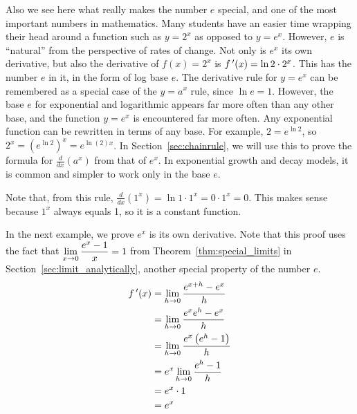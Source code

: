 Also we see here what really makes the number $e$ special, and one of the most important numbers in mathematics.  Many students have an easier time wrapping their head around a function such as $y=2^x$ as opposed to $y=e^x$.  However, $e$ is ``natural'' from the perspective of rates of change.  Not only is $e^x$ its own derivative, but also the derivative of $f(x)=2^x$ is $f\,'(x)=\ln 2\cdot 2^x$.  This has the number $e$ in it, in the form of log base $e$.
The derivative rule for $y=e^x$ can be remembered as a special case of the $y=a^x$ rule, since $\ln e=1$.  However,
the base $e$ for exponential and logarithmic appears far more often than any other base, and the function $y=e^x$ is encountered far more often.
Any exponential function can be rewritten in terms of any base.  For example, $2=e^{\ln 2}$, so $2^x=\left(e^{\ln 2}\right)^x = e^{\ln(2) x}$.
In Section~\ref{sec:chainrule}, we will use this to prove the formula for $\frac{d}{dx}(a^x)$ from that of $e^x$.
In exponential growth and decay models, it is common and simpler to work only in the base $e$.

Note that, from this rule, $\frac{d}{dx}(1^x)=\ln 1\cdot 1^x = 0\cdot 1^x = 0$.  This makes sense because $1^x$ always equals 1, so it is a constant function.

In the next example, we prove $e^x$ is its own derivative.  Note that this proof uses the fact that $\displaystyle \lim_{x\to 0} \frac{e^x - 1}{x}=1$ from Theorem~\ref{thm:special_limits} in Section~\ref{sec:limit_analytically}, another special property of the number $e$.\\

{		%
		\begin{align*}
		\fp(x) &= \lim_{h\to 0} \frac{e^{x+h}-e^x}{h}\\ %
						&= \lim_{h\to 0} \frac{e^x e^h - e^x}{h}\\ %
						&= \lim_{h\to 0} \frac{e^x \left(e^h - 1 \right)}{h}\\%
						&=e^x \lim_{h\to 0} \frac{e^h - 1}{h}\\ %
						&=	e^x \cdot 1 \\
						&= e^x
		\end{align*}
}\\


